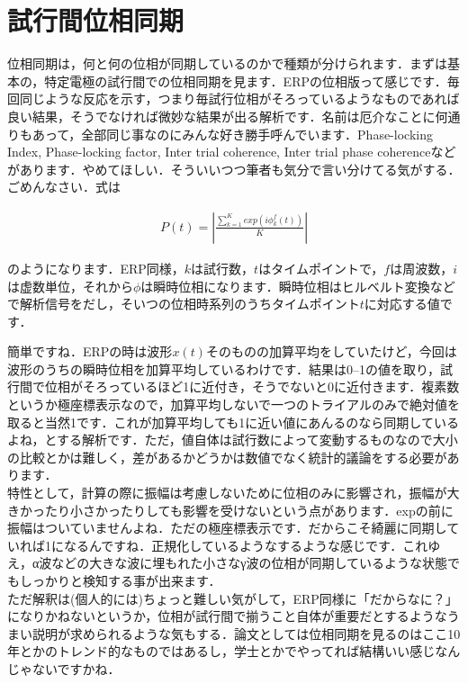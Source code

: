 \documentclass[11pt,a4paper]{ujreport} 	%
\begin{document}
\section{試行間位相同期}
位相同期は，何と何の位相が同期しているのかで種類が分けられます．まずは基本の，特定電極の試行間での位相同期を見ます．ERPの位相版って感じです．毎回同じような反応を示す，つまり毎試行位相がそろっているようなものであれば良い結果，そうでなければ微妙な結果が出る解析です．名前は厄介なことに何通りもあって，全部同じ事なのにみんな好き勝手呼んでいます．Phase-locking Index, Phase-locking factor, Inter trial coherence, Inter trial phase coherenceなどがあります．やめてほしい．そういいつつ筆者も気分で言い分けてる気がする．ごめんなさい．式は

\begin{eqnarray}
  \label{eq:pli}
  P(t) = |\frac{\sum_{k=1}^K exp(i \phi_k^f(t))}{K}|
\end{eqnarray}

のようになります．ERP同様，$k$は試行数，$t$はタイムポイントで，$f$は周波数，$i$は虚数単位，それから$\phi$は瞬時位相になります．瞬時位相はヒルベルト変換などで解析信号をだし，そいつの位相時系列のうちタイムポイント$t$に対応する値です．

簡単ですね．ERPの時は波形$x(t)$そのものの加算平均をしていたけど，今回は波形のうちの瞬時位相を加算平均しているわけです．結果は0--1の値を取り，試行間で位相がそろっているほど1に近付き，そうでないと0に近付きます．複素数というか極座標表示なので，加算平均しないで一つのトライアルのみで絶対値を取ると当然1です．これが加算平均しても1に近い値にあんるのなら同期しているよね，とする解析です．ただ，値自体は試行数によって変動するものなので大小の比較とかは難しく，差があるかどうかは数値でなく統計的議論をする必要があります．\\

特性として，計算の際に振幅は考慮しないために位相のみに影響され，振幅が大きかったり小さかったりしても影響を受けないという点があります．expの前に振幅はついていませんよね．ただの極座標表示です．だからこそ綺麗に同期していれば1になるんですね．正規化しているようなするような感じです．これゆえ，α波などの大きな波に埋もれた小さなγ波の位相が同期しているような状態でもしっかりと検知する事が出来ます．\\

ただ解釈は(個人的には)ちょっと難しい気がして，ERP同様に「だからなに？」になりかねないというか，位相が試行間で揃うこと自体が重要だとするようなうまい説明が求められるような気もする．論文としては位相同期を見るのはここ10年とかのトレンド的なものではあるし，学士とかでやってれば結構いい感じなんじゃないですかね．
\end{document}
